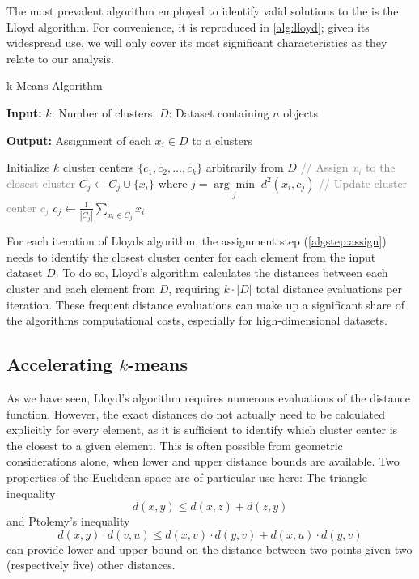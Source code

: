 The most prevalent algorithm employed to identify valid solutions to the \kmeans is the Lloyd algorithm.
For convenience, it is reproduced in \autoref{alg:lloyd};
given its widespread use, we will only cover its most significant characteristics as they relate to our analysis.

\begin{algorithm}
	\caption{k-Means Algorithm}
	\label{alg:lloyd}

	\textbf{Input:} \( k \): Number of clusters, \( D \): Dataset containing \( n \) objects

	\textbf{Output:} Assignment of each $x_i \in D$ to a clusters

	\begin{algorithmic}[1]
		\State Initialize \( k \) cluster centers \( \{c_1, c_2, \dots, c_k\} \) arbitrarily from \( D \)
		\Repeat
		\label{algstep:assign}
		\State \textcolor{gray}{// Assign \( x_i \) to the closest cluster}
		\State \( C_j \leftarrow C_j \cup \{x_i\} \) where \( j = \underset{j}{\arg\min} \; d^2(x_i, c_j) \)
		\EndFor
		\State \textcolor{gray}{// Update cluster center \( c_j \)}
		\State \( c_j \leftarrow \frac{1}{|C_j|} \sum_{x_i \in C_j} x_i \)
		\EndFor
	\end{algorithmic}
\end{algorithm}

For each iteration of Lloyds algorithm, the assignment step (\autoref{algstep:assign}) needs to identify the closest cluster center for each element from the input dataset $D$.
To do so, Lloyd's algorithm calculates the distances between each cluster and each element from $D$, requiring $k\cdot|D|$ total distance evaluations per iteration.
These frequent distance evaluations can make up a significant share of the algorithms computational costs, especially for high-dimensional datasets.

\subsection{Accelerating $k$-means}
\label{sub:acc}

As we have seen, Lloyd's algorithm requires numerous evaluations of the distance function.
However, the exact distances do not actually need to be calculated explicitly for every element, as it is sufficient to identify which cluster center is the closest to a given element.
This is often possible from geometric considerations alone, when lower and upper distance bounds are available.
Two properties of the Euclidean space are of particular use here:
The triangle inequality
$$ d(x,y) \leq d(x,z) + d(z,y) $$
and Ptolemy's inequality
$$ d(x, y)\cdot d(v, u) \leq d(x, v) \cdot d(y,v) + d(x, u) \cdot d(y, v)$$
can provide lower and upper bound on the distance between two points given two (respectively five) other distances.

